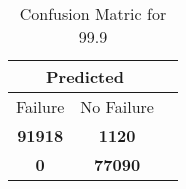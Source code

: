 \begin{table}[] 
\caption{Confusion Matric for 99.9} 
\label{Table: Prediction Accuracy-DMD99.9OnlySunEKF-combinationReflectionEKF-top2-Reflection} 
\centering 
\begin{tabular} 
 {@{}ccc@{}} 
\toprule 
\multicolumn{2}{c}{\textbf{Predicted}}
 \\ \midrule 
\multicolumn{1}{|c|}{Failure} & 
\multicolumn{1}{c|}{No Failure}
 \\ \midrule 
\multicolumn{1}{|c|}{\color{green}\textbf{91918}} & 
\multicolumn{1}{c|}{\color{red}\textbf{1120}}
 \\ \midrule 
\multicolumn{1}{|c|}{\color{red}\textbf{0}} & 
\multicolumn{1}{c|}{\color{green}\textbf{77090}}
 \\ \bottomrule 
\end{tabular} 
\end{table} 
